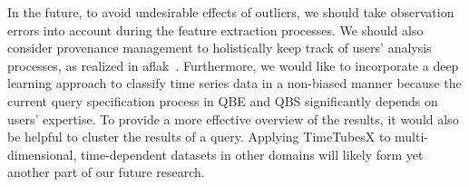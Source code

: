 In the future, 
to avoid undesirable effects of outliers,
we should take observation errors into account during the feature extraction processes. 
We should also consider provenance management to holistically keep track of users’ analysis processes, as realized in aflak~\cite{Boussejra2019}.
Furthermore, we would like to incorporate a deep learning approach to classify time series data in a non-biased manner because the current query specification process in QBE and QBS significantly depends on users' expertise.
To provide a more effective overview of the results, it would also be helpful to cluster the results of a query. %
Applying TimeTubesX to multi-dimensional, time-dependent datasets in other domains will likely form yet another part of our future research.